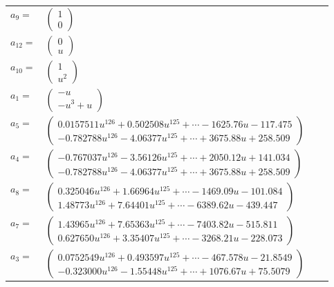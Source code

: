 \documentclass[1p]{elsarticle_modified}
\theoremstyle{definition}
\begin{document}
\begin{tabular}{m{7pt} m{180pt} m{7pt} m{180pt} }
\flushright $a_{9}=$&$\begin{pmatrix}1\\0\end{pmatrix}$ \\
\flushright $a_{12}=$&$\begin{pmatrix}0\\u\end{pmatrix}$ \\
\flushright $a_{10}=$&$\begin{pmatrix}1\\u^2\end{pmatrix}$ \\
\flushright $a_{1}=$&$\begin{pmatrix}- u\\- u^3+u\end{pmatrix}$ \\
\flushright $a_{5}=$&$\begin{pmatrix}0.0157511 u^{126}+0.502508 u^{125}+\cdots-1625.76 u-117.475\\-0.782788 u^{126}-4.06377 u^{125}+\cdots+3675.88 u+258.509\end{pmatrix}$ \\
\flushright $a_{4}=$&$\begin{pmatrix}-0.767037 u^{126}-3.56126 u^{125}+\cdots+2050.12 u+141.034\\-0.782788 u^{126}-4.06377 u^{125}+\cdots+3675.88 u+258.509\end{pmatrix}$ \\
\flushright $a_{8}=$&$\begin{pmatrix}0.325046 u^{126}+1.66964 u^{125}+\cdots-1469.09 u-101.084\\1.48773 u^{126}+7.64401 u^{125}+\cdots-6389.62 u-439.447\end{pmatrix}$ \\
\flushright $a_{7}=$&$\begin{pmatrix}1.43965 u^{126}+7.65363 u^{125}+\cdots-7403.82 u-515.811\\0.627650 u^{126}+3.35407 u^{125}+\cdots-3268.21 u-228.073\end{pmatrix}$ \\
\flushright $a_{3}=$&$\begin{pmatrix}0.0752549 u^{126}+0.493597 u^{125}+\cdots-467.578 u-21.8549\\-0.323000 u^{126}-1.55448 u^{125}+\cdots+1076.67 u+75.5079\end{pmatrix}$ \\

\end{tabular}
\end{document}

